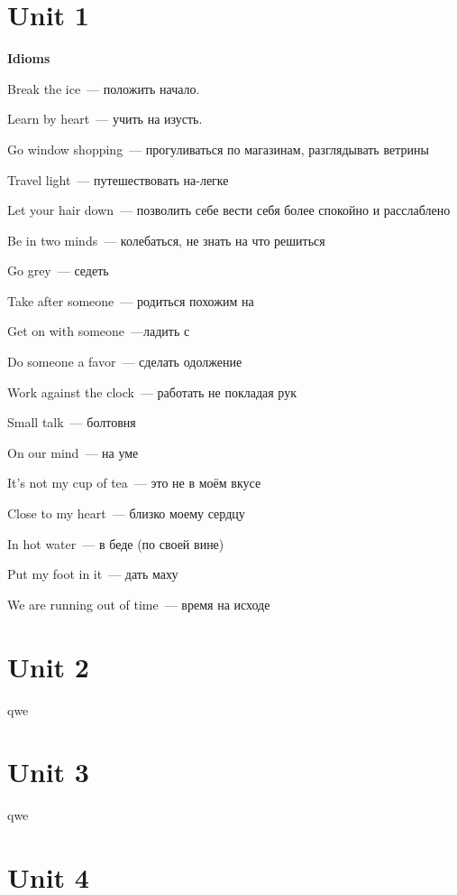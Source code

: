 \documentclass[10pt,a4paper]{article}
\begin{document}
\section{Unit 1}
\textbf{Idioms}

\noindent
Break the ice~--- положить начало.

\noindent
Learn by heart~--- учить на изусть.

\noindent
Go window shopping~--- прогуливаться по магазинам, разглядывать ветрины

\noindent
Travel light~--- путешествовать на-легке

\noindent
Let your hair down~--- позволить себе вести себя более спокойно и расслаблено

\noindent
Be in two minds~--- колебаться, не знать на что решиться

\noindent
Go grey~--- седеть

\noindent
Take after someone~--- родиться похожим на

\noindent
Get on with someone~---ладить с 

\noindent
Do someone a favor~--- сделать одолжение

\noindent
Work against the clock~--- работать не покладая рук

\noindent
Small talk~--- болтовня

\noindent
On our mind~--- на уме

\noindent
It's not my cup of tea~--- это не в моём вкусе

\noindent
Close to my heart~--- близко моему сердцу

\noindent
In hot water~--- в беде (по своей вине)

\noindent
Put my foot in it~--- дать маху

\noindent
We are running out of time~--- время на исходе



\section{Unit 2}
qwe



\section{Unit 3}
qwe



\section{Unit 4}
\end{document}
